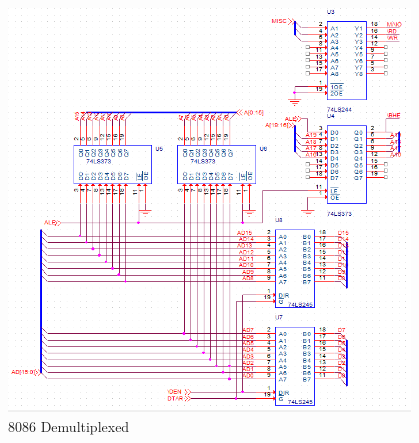         \begin{figure}[ht]
            \begin{center}
                \includegraphics[width=0.95\textwidth]{figures/schematics/page2.png}
                \caption{8086 Demultiplexed} \label{fig:page2}
            \end{center}
        \end{figure}

